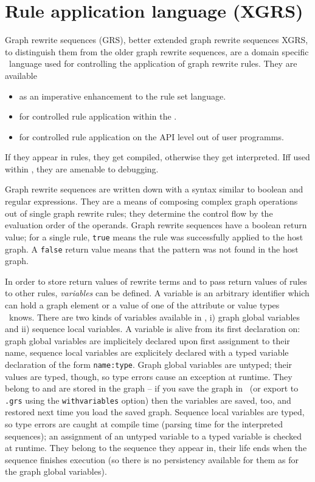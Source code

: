\chapter{Rule application language (XGRS)}
\label{cha:xgrs}

Graph rewrite sequences (GRS), better extended graph rewrite sequences XGRS, to distinguish them from the older graph rewrite sequences, are a domain specific \GrG~language used for controlling the application of graph rewrite rules. 
They are available
\begin{itemize}
\item as an imperative enhancement to the rule set language.
\item for controlled rule application within the \GrShell.
\item for controlled rule application on the API level out of user programms.
\end{itemize}

If they appear in rules, they get compiled, otherwise they get interpreted.
Iff used within \GrShell, they are amenable to debugging.

Graph rewrite sequences are written down with a syntax similar to boolean and regular expressions.
They are a means of composing complex graph operations out of single graph rewrite rules; 
they determine the control flow by the evaluation order of the operands.
Graph rewrite sequences have a boolean return value; for a single rule, \texttt{true} means the rule was successfully applied to the host graph.
A \texttt{false} return value means that the pattern was not found in the host graph.

In order to store return values of rewrite terms and to pass return values of rules to other rules, \emph{variables} can be defined.
A variable is an arbitrary identifier which can hold a graph element or a value of one of the attribute or value types \GrG\ knows.
There are two kinds of variables available in \GrG, i) graph global variables and ii) sequence local variables.
A variable is alive from its first declaration on: graph global variables are implicitely declared upon first assignment to their name,
sequence local variables are explicitely declared with a typed variable declaration of the form \texttt{name:type}.
Graph global variables are untyped; their values are typed, though, so type errors cause an exception at runtime.
They belong to and are stored in the graph -- if you save the graph in \GrShell\ (or export to \texttt{.grs} using the \texttt{withvariables} option)
then the variables are saved, too, and restored next time you load the saved graph.
Sequence local variables are typed, so type errors are caught at compile time (parsing time for the interpreted sequences); 
an assignment of an untyped variable to a typed variable is checked at runtime.
They belong to the sequence they appear in, their life ends when the sequence finishes execution 
(so there is no persistency available for them as for the graph global variables). 


